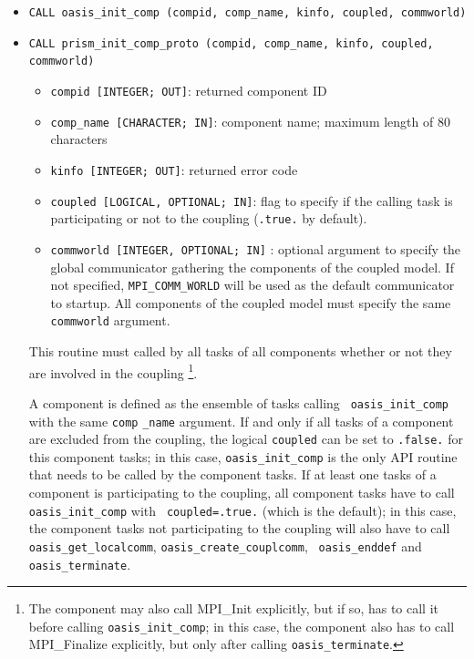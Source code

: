 \begin{itemize}

\item {\tt CALL oasis\_init\_comp (compid, comp\_name, kinfo, coupled, commworld)}
\item {\tt CALL prism\_init\_comp\_proto (compid, comp\_name, kinfo, coupled, commworld)}

  \begin{itemize}
  \item {\tt compid [INTEGER; OUT]}: returned component ID
  \item {\tt comp\_name [CHARACTER; IN]}: component name; maximum length of 80 characters 
  \item {\tt kinfo [INTEGER; OUT]}: returned error code
  \item {\tt coupled [LOGICAL, OPTIONAL; IN]}: flag to specify if the calling task is participating or not to the coupling ({\tt .true.} by default). 
  \item {\tt commworld [INTEGER, OPTIONAL; IN]} : optional argument to specify the global communicator gathering the components of the coupled model. 
  If not specified, {\tt MPI\_COMM\_WORLD} will be used as the default communicator to startup. All components of the coupled model must 
  specify the same {\tt commworld} argument.

  \end{itemize}
 
  This routine must called by all tasks of all components whether or not they are involved in the coupling \footnote{The component may also call MPI\_Init explicitly, but if so, has to call it before calling {\tt oasis\_init\_comp}; in this case, the component also has to call MPI\_Finalize explicitly, but only after calling {\tt oasis\_terminate}.}. 

A component is defined as the ensemble of tasks  calling {\tt
  oasis\_init\_comp} with the same {\tt comp} {\tt \_name}
argument. If and only if all tasks of a component are excluded from
the coupling, the logical {\tt coupled} can be set to {\tt .false.}
for this component tasks; in this case, {\tt oasis\_init\_comp} is the
only API routine that needs to be called by the component tasks. If at
least one tasks of a component is participating to the coupling, all
component tasks have to call {\tt oasis\_init\_comp} with {\tt
  coupled=.true.} (which is the default); in this case, the component tasks not
participating to the coupling will also have to call {\tt oasis\_get\_localcomm}, {\tt oasis\_create\_couplcomm}, {\tt
  oasis\_enddef} and {\tt oasis\_terminate}.
\end{itemize}

